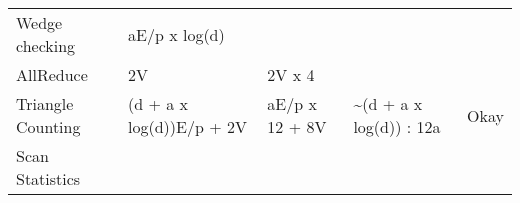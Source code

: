 \documentclass[10pt,oneside]{memoir}
\begin{document}
\begin{longtable}[]{@{}lllll@{}}
\begin{minipage}[t]{0.23\columnwidth}\raggedright
Wedge checking\strut
\end{minipage} & \begin{minipage}[t]{0.12\columnwidth}\raggedright
aE/p x log(d)\strut
\end{minipage} & \begin{minipage}[t]{0.15\columnwidth}\raggedright
\strut
\end{minipage} & \begin{minipage}[t]{0.22\columnwidth}\raggedright
\strut
\end{minipage} & \begin{minipage}[t]{0.13\columnwidth}\raggedright
\strut
\end{minipage}\tabularnewline
\begin{minipage}[t]{0.23\columnwidth}\raggedright
AllReduce\strut
\end{minipage} & \begin{minipage}[t]{0.12\columnwidth}\raggedright
2V\strut
\end{minipage} & \begin{minipage}[t]{0.15\columnwidth}\raggedright
2V x 4\strut
\end{minipage} & \begin{minipage}[t]{0.22\columnwidth}\raggedright
\strut
\end{minipage} & \begin{minipage}[t]{0.13\columnwidth}\raggedright
\strut
\end{minipage}\tabularnewline
\begin{minipage}[t]{0.23\columnwidth}\raggedright
Triangle Counting\strut
\end{minipage} & \begin{minipage}[t]{0.12\columnwidth}\raggedright
(d + a x log(d))E/p + 2V\strut
\end{minipage} & \begin{minipage}[t]{0.15\columnwidth}\raggedright
aE/p x 12 + 8V\strut
\end{minipage} & \begin{minipage}[t]{0.22\columnwidth}\raggedright
\textasciitilde{}(d + a x log(d)) : 12a\strut
\end{minipage} & \begin{minipage}[t]{0.13\columnwidth}\raggedright
Okay\strut
\end{minipage}\tabularnewline
\begin{minipage}[t]{0.23\columnwidth}\raggedright
Scan Statistics\strut

\end{minipage}
\end{longtable}
\end{document}

